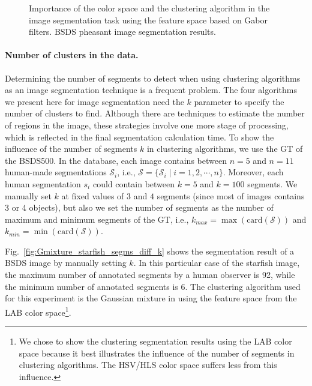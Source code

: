 \begin{figure}[!ht]
	\caption{Importance of the color space and the clustering algorithm in the image segmentation task using the feature space based on Gabor filters. BSDS pheasant image segmentation results.}\label{fig:pheasant_clustering_method_v_colorspace}    
\end{figure}



\paragraph{Number of clusters in the data.} 
Determining the number of segments to detect when using clustering algorithms as an image segmentation technique is a frequent problem. The four algorithms we present here for image segmentation need the $k$ parameter to specify the number of clusters to find. Although there are techniques to estimate the number of regions in the image, these strategies involve one more stage of processing, which is reflected in the final segmentation calculation time. To show the influence of the number of segments $k$ in clustering algorithms, we use the GT of the BSDS500. In the database, each image contains between $n=5$ and $n=11$ human-made segmentations $\mathcal{S}_i$, i.e., $\mathcal{S}=\{\mathcal{S}_i \;| \; i = 1,2, \cdots, n\}$. Moreover, each human segmentation $s_i$ could contain between $k=5$ and $k=100$ segments. We manually set $k$ at fixed values of $3$ and $4$ segments (since most of images contains 3 or 4 objects), but also we set the number of segments as the number of maximum and minimum segments of the GT, i.e., $k_{max}=\max\left(\mathrm{card}(\mathcal{S})\right)$ and $k_{min}=\min\left(\mathrm{card}(\mathcal{S})\right)$.

Fig.\ \ref{fig:Gmixture_starfish_segms_diff_k} shows the segmentation result of a BSDS image by manually setting $k$. In this particular case of the starfish image, the maximum number of annotated segments by a human observer is 92, while the minimum number of annotated segments is 6. The clustering algorithm used for this experiment is the Gaussian mixture in using the feature space from the LAB color space\footnote{We chose to show the clustering segmentation results using the LAB color space because it best illustrates the influence of the number of segments in clustering algorithms. The HSV/HLS color space suffers less from this influence.}.


